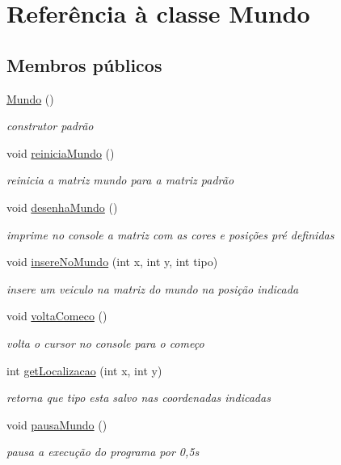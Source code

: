 \hypertarget{class_mundo}{}\section{Referência à classe Mundo}
\label{class_mundo}
\subsection*{Membros públicos}
\begin{DoxyCompactItemize}
\item 
\mbox{\hyperlink{class_mundo_ae3801a0a633ad3475456c67639561105}{Mundo}} ()
\begin{DoxyCompactList}\small\item\em construtor padrão \end{DoxyCompactList}\item 
void \mbox{\hyperlink{class_mundo_a6e10fa6c3ae633a67e2ba897d83ab951}{reinicia\+Mundo}} ()
\begin{DoxyCompactList}\small\item\em reinicia a matriz mundo para a matriz padrão \end{DoxyCompactList}\item 
void \mbox{\hyperlink{class_mundo_adbafcb32f5f209eda97e1c7953c6e599}{desenha\+Mundo}} ()
\begin{DoxyCompactList}\small\item\em imprime no console a matriz com as cores e posições pré definidas \end{DoxyCompactList}\item 
void \mbox{\hyperlink{class_mundo_afec47a52ae6772f201f120fc62ba4546}{insere\+No\+Mundo}} (int x, int y, int tipo)
\begin{DoxyCompactList}\small\item\em insere um veiculo na matriz do mundo na posição indicada \end{DoxyCompactList}\item 
void \mbox{\hyperlink{class_mundo_a546c0413297120b08815afafcc0e7d32}{volta\+Comeco}} ()
\begin{DoxyCompactList}\small\item\em volta o cursor no console para o começo \end{DoxyCompactList}\item 
int \mbox{\hyperlink{class_mundo_ac971ab63c34c7ab0c00df63277589338}{get\+Localizacao}} (int x, int y)
\begin{DoxyCompactList}\small\item\em retorna que tipo esta salvo nas coordenadas indicadas \end{DoxyCompactList}\item 
void \mbox{\hyperlink{class_mundo_a871bfb3ebd38d8ce498777bb0dd1cdeb}{pausa\+Mundo}} ()
\begin{DoxyCompactList}\small\item\em pausa a execução do programa por 0,5s \end{DoxyCompactList}\end{DoxyCompactItemize}
